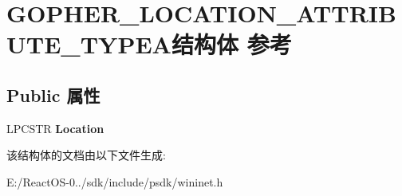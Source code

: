 \hypertarget{struct_g_o_p_h_e_r___l_o_c_a_t_i_o_n___a_t_t_r_i_b_u_t_e___t_y_p_e_a}{}\section{G\+O\+P\+H\+E\+R\+\_\+\+L\+O\+C\+A\+T\+I\+O\+N\+\_\+\+A\+T\+T\+R\+I\+B\+U\+T\+E\+\_\+\+T\+Y\+P\+E\+A结构体 参考}
\label{struct_g_o_p_h_e_r___l_o_c_a_t_i_o_n___a_t_t_r_i_b_u_t_e___t_y_p_e_a}
\subsection*{Public 属性}
\begin{DoxyCompactItemize}
\item 
\mbox{\label{struct_g_o_p_h_e_r___l_o_c_a_t_i_o_n___a_t_t_r_i_b_u_t_e___t_y_p_e_a_a80ae5e53f6f4c83d7520ac1845dc0dc0}} 
L\+P\+C\+S\+TR {\bfseries Location}
\end{DoxyCompactItemize}


该结构体的文档由以下文件生成\+:\begin{DoxyCompactItemize}
\item 
E\+:/\+React\+O\+S-\/0../sdk/include/psdk/wininet.\+h\end{DoxyCompactItemize}
